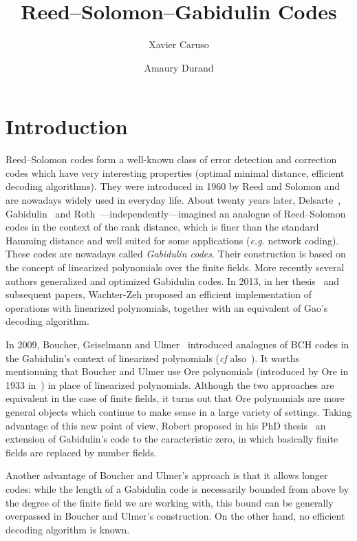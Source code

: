 \documentclass[a4paper]{llncs}
\title{Reed--Solomon--Gabidulin Codes}
\author{Xavier Caruso\inst{1} \and Amaury Durand\inst{2}}
\institute{%
CNRS, Institut Mathématique de Bordeaux, équipe-projet LFANT\
\email{xavier.caruso@normalesup.org}
\and
Université de Franche-Comté\
\email{amaury.durand@edu.univ-fcomte.fr}}
\begin{document}
\maketitle

\section*{Introduction}

Reed--Solomon codes form a well-known class of error detection and 
correction codes which have very interesting properties (optimal minimal 
distance, efficient decoding algorithms). They were introduced in 1960 
by Reed and Solomon and are nowadays widely used in everyday life. About 
twenty years later, Delsarte~\cite{delsarte}, Gabidulin~\cite{gabidulin} 
and Roth~\cite{roth}---independently---imagined an analogue of 
Reed--Solomon codes in the context of the rank distance, which is finer 
than the standard Hamming distance and well suited for some applications 
(\emph{e.g.} network coding). These codes are nowadays called 
\emph{Gabidulin codes}. Their construction is based on the concept of 
linearized polynomials over the finite fields. More recently several 
authors generalized and optimized Gabidulin codes. In 2013, in her 
thesis~\cite{wachter} and subsequent papers, Wachter-Zeh proposed an 
efficient implementation of operations with linearized polynomials, 
together with an equivalent of Gao's decoding algorithm.

In 2009, Boucher, Geiselmann and Ulmer~\cite{bougeiulm} introduced 
analogues of BCH codes in the Gabidulin's context of linearized 
polynomials (\emph{cf} also~\cite{bouulm}). 
It worths mentionning that Boucher and Ulmer use Ore 
polynomials (introduced by Ore in 1933 in~\cite{ore}) in place of 
linearized polynomials. Although the two approaches are equivalent in 
the case of finite fields, it turns out that Ore polynomials are more 
general objects which continue to make sense in a large variety of 
settings.
Taking advantage of this new point of view, Robert proposed in his
PhD thesis~\cite{robert} an extension of Gabidulin's code to the
caracteristic zero, in which basically finite fields are replaced 
by number fields.

Another advantage of Boucher and Ulmer's approach is that it allows 
longer codes: while the length of a Gabidulin code is necessarily 
bounded from above by the degree of the finite field we are working 
with, this bound can be generally overpassed in Boucher and Ulmer's 
construction. On the other hand, no efficient decoding algorithm is 
known.
\end{document}
